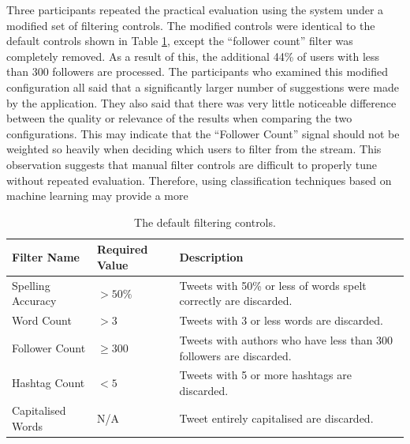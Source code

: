 \documentclass{l4proj}
\begin{document}
Three participants repeated the practical evaluation using the system under a modified set of filtering controls. The modified controls were identical to the default controls shown in Table \ref{table:standardfilters}, except the ``follower count'' filter was completely removed. As a result of this, the additional 44\% of users with less than 300 followers are processed. The participants who examined this modified configuration all said that a significantly larger number of suggestions were made by the application. They also said that there was very little noticeable difference between the quality or relevance of the results when comparing the two configurations. This may indicate that the ``Follower Count'' signal should not be weighted so heavily when deciding which users to filter from the stream. This observation suggests that manual filter controls are difficult to properly tune without repeated evaluation. Therefore, using classification techniques based on machine learning may provide a more 
    

   
\begin{table}
    \centering
    \begin{tabular}{| l | l | l |}
    \hline
    Filter Name & Required Value & Description\\ \hline
    Spelling Accuracy & $>50\%$ & Tweets with 50\% or less of words spelt correctly are discarded.  \\ \hline
    Word Count & $>3$ & Tweets with 3 or less words are discarded.  \\ \hline
    Follower Count & $\geq300$ & Tweets with authors who have less than 300 followers are discarded. \\ \hline
    Hashtag Count & $<5$ & Tweets with 5 or more hashtags are discarded. \\ \hline
    Capitalised Words & N/A & Tweet entirely capitalised are discarded. \\
    
    \hline
    \end{tabular}
    \caption{\label{table:standardfilters}The default filtering controls.}
\end{table}

    
\end{document}
